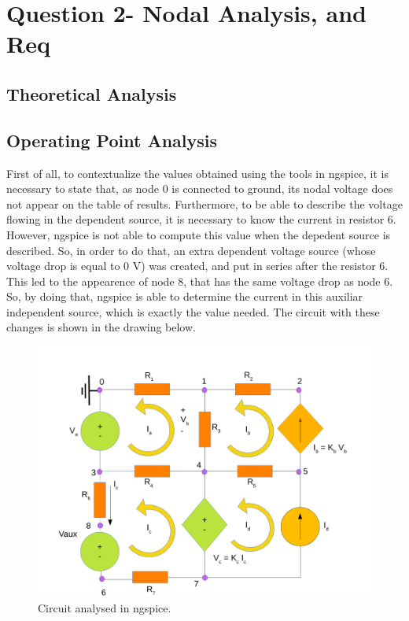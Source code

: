\section{Question 2- Nodal Analysis, and Req}


\subsection{Theoretical Analysis}




\subsection{Operating Point Analysis}
First of all, to contextualize the values obtained using the tools in ngspice, it is necessary to state that, as node 0 is connected to ground, its nodal voltage does not appear on the table of results. Furthermore, to be able to describe the voltage flowing in the dependent source, it is necessary to know the current in resistor 6. However, ngspice is not able to compute this value when the depedent source is described. So, in order to do that, an extra dependent voltage source (whose voltage drop is equal to 0 V) was created, and put in series after the resistor 6. This led to the appearence of node 8, that has the same voltage drop as node 6. So, by doing that, ngspice is able to determine the current in this auxiliar independent source, which is exactly the value needed.
 The circuit with these changes is shown in the drawing below.

\begin{figure}[ht] \centering
\includegraphics[width=1.0\linewidth]{simdraw.pdf}
\caption{Circuit analysed in ngspice.}
\label{simdraw}
\end{figure}

